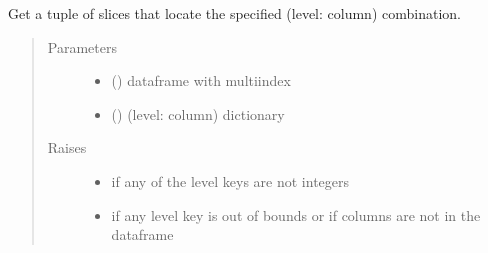 \documentclass[letterpaper,10pt,english]{sphinxmanual}
\begin{document}
\begin{fulllineitems}
\label{\detokenize{dalio.util:dalio.util.level_utils.get_slice_from_dict}}
Get a tuple of slices that locate the specified (level: column)
combination.
\begin{quote}\begin{description}
\item[{Parameters}] \leavevmode\begin{itemize}
\item {} 
 () \textendash{} dataframe with multiindex

\item {} 
 () \textendash{} (level: column) dictionary

\end{itemize}

\item[{Raises}] \leavevmode\begin{itemize}
\item {} 
 \textendash{} if any of the level keys are not integers

\item {} 
 \textendash{} if any level key is out of bounds or if columns are not in
    the dataframe

\end{itemize}

\end{description}\end{quote}

\end{fulllineitems}

\end{document}
